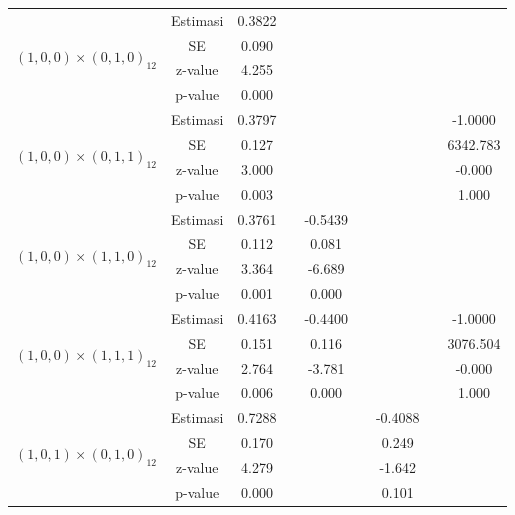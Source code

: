 \begin{enumerate}[label=\alph*.]
\begin{longtable}{|c|c|c|c|c|c|c|c|c|}
            \multirow{4}{*}{$(1,0,0)\times(0,1,0)_{12}$}
            & Estimasi & 0.3822  & {} & {} & {} & {} & {} & {} \\ \cline{2-9}
            & SE       & 0.090  & {} & {} & {} & {} & {} & {} \\ \cline{2-9}
            & z-value  & 4.255   & {} & {} & {} & {} & {} & {}\\ \cline{2-9}
            & p-value  & 0.000 & {} & {} & {} & {} & {} & {} \\ \hline

            \multirow{4}{*}{$(1,0,0)\times(0,1,1)_{12}$}
            & Estimasi & 0.3797  & {} & {} & {} & {} & {} & -1.0000 \\ \cline{2-9}
            & SE       & 0.127  & {} & {} & {} & {} & {} & 6342.783\\ \cline{2-9}
            & z-value  & 3.000   & {} & {} & {} & {} & {} & -0.000\\ \cline{2-9}
            & p-value  & 0.003 & {} & {} & {} & {} & {} & 1.000\\ \hline

            \multirow{4}{*}{$(1,0,0)\times(1,1,0)_{12}$}
            & Estimasi & 0.3761  & {} & -0.5439 & {} & {} & {} & {}\\ \cline{2-9}
            & SE       & 0.112  & {} & 0.081 & {} & {} & {} & {}\\ \cline{2-9}
            & z-value  & 3.364   & {} & -6.689 & {} & {} & {}& {}\\ \cline{2-9}
            & p-value  & 0.001 & {} & 0.000 & {} & {} & {} & {}\\ \hline

            \multirow{4}{*}{$(1,0,0)\times(1,1,1)_{12}$}
            & Estimasi & 0.4163  & {} & -0.4400 & {} & {} & {} & -1.0000 \\ \cline{2-9}
            & SE       & 0.151    & {} & 0.116 & {} & {} & {} & 3076.504\\ \cline{2-9}
            & z-value  & 2.764   & {} & -3.781 & {} & {} & {} & -0.000\\ \cline{2-9}
            & p-value  & 0.006   & {} &  0.000 & {} & {} & {} & 1.000\\ \hline

            \multirow{4}{*}{$(1,0,1)\times(0,1,0)_{12}$}
            & Estimasi & 0.7288  & {} & {} & {} & -0.4088 & {} & {}\\ \cline{2-9}
            & SE       & 0.170 & {} & {} & {} & 0.249 & {} & {}\\ \cline{2-9}
            & z-value  & 4.279   & {} & {} & {} & -1.642 & {}& {}\\ \cline{2-9}
            & p-value  & 0.000 & {} & {} & {} & 0.101 & {} & {}\\ \hline


\end{longtable}
\end{enumerate}
